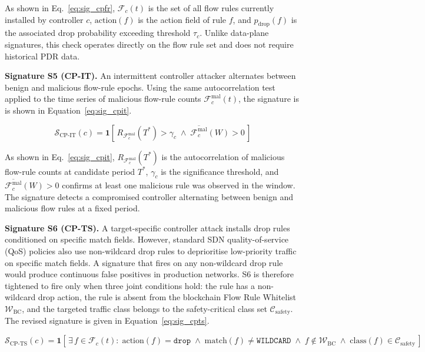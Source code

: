 \documentclass[12pt, a4paper]{report}
\begin{document}
As shown in Eq.~\eqref{eq:sig_cpfr}, $\mathcal{F}_c(t)$ is the set 
of all flow rules currently installed by controller $c$, 
$\text{action}(f)$ is the action field of rule $f$, and 
$p_{\text{drop}}(f)$ is the associated drop probability exceeding 
threshold $\tau_c$. Unlike data-plane signatures, this check operates 
directly on the flow rule set and does not require historical PDR data.

\textbf{Signature S5 (CP-IT).} An intermittent controller attacker alternates
between benign and malicious flow-rule epochs. Using the same autocorrelation
test applied to the time series of malicious flow-rule counts
$\mathcal{F}_c^{\text{mal}}(t)$, the signature is is shown in Equation~\eqref{eq:sig_cpit}.

\begin{equation}
\label{eq:sig_cpit}
\mathcal{S}_{\text{CP-IT}}(c) =
\mathbf{1}\!\left[\,
R_{\mathcal{F}_c^{\text{mal}}}(T^*) > \gamma_c \;\wedge\;
\overline{\mathcal{F}_c^{\text{mal}}}(W) > 0
\,\right]
\end{equation}

As shown in Eq.~\eqref{eq:sig_cpit}, $R_{\mathcal{F}_c^{\text{mal}}}(T^*)$ 
is the autocorrelation of malicious flow-rule counts at candidate 
period $T^*$, $\gamma_c$ is the significance threshold, and 
$\overline{\mathcal{F}_c^{\text{mal}}}(W) > 0$ confirms at least one 
malicious rule was observed in the window. The signature detects a 
compromised controller alternating between benign and malicious flow 
rules at a fixed period.

\textbf{Signature S6 (CP-TS).}
A target-specific controller attack installs drop rules conditioned
on specific match fields. However, standard SDN quality-of-service
(QoS) policies also use non-wildcard drop rules to deprioritise
low-priority traffic on specific match fields. A signature that
fires on any non-wildcard drop rule would produce continuous false
positives in production networks. S6 is therefore tightened to
fire only when three joint conditions hold: the rule has a
non-wildcard drop action, the rule is absent from the blockchain
Flow Rule Whitelist $\mathcal{W}_{\text{BC}}$, and the targeted
traffic class belongs to the safety-critical class set
$\mathcal{C}_{\text{safety}}$. The revised signature is given in
Equation~\eqref{eq:sig_cpts}.

\begin{equation}
\label{eq:sig_cpts}
\mathcal{S}_{\text{CP-TS}}(c) =
\mathbf{1}\!\left[\,
\exists\,f \in \mathcal{F}_c(t) :
\;\mathrm{action}(f) = \texttt{drop}
\;\wedge\;
\mathrm{match}(f) \neq \texttt{WILDCARD}
\;\wedge\;
f \notin \mathcal{W}_{\text{BC}}
\;\wedge\;
\mathrm{class}(f) \in \mathcal{C}_{\text{safety}}
\,\right]
\end{equation}
\end{document}
